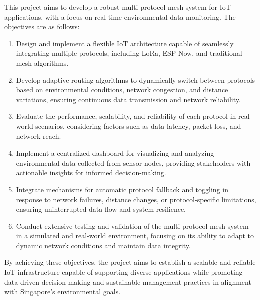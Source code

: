 This project aims to develop a robust multi-protocol mesh system for IoT applications, with a focus on real-time environmental data monitoring. The objectives are as follows:

\begin{enumerate}
    \item Design and implement a flexible IoT architecture capable of seamlessly integrating multiple protocols, including LoRa, ESP-Now, and traditional mesh algorithms.
    \item Develop adaptive routing algorithms to dynamically switch between protocols based on environmental conditions, network congestion, and distance variations, ensuring continuous data transmission and network reliability.
    \item Evaluate the performance, scalability, and reliability of each protocol in real-world scenarios, considering factors such as data latency, packet loss, and network reach.
    \item Implement a centralized dashboard for visualizing and analyzing environmental data collected from sensor nodes, providing stakeholders with actionable insights for informed decision-making.
    \item Integrate mechanisms for automatic protocol fallback and toggling in response to network failures, distance changes, or protocol-specific limitations, ensuring uninterrupted data flow and system resilience.
    \item Conduct extensive testing and validation of the multi-protocol mesh system in a simulated and real-world environment, focusing on its ability to adapt to dynamic network conditions and maintain data integrity.
\end{enumerate}

By achieving these objectives, the project aims to establish a scalable and reliable IoT infrastructure capable of supporting diverse applications while promoting data-driven decision-making and sustainable management practices in alignment with Singapore's environmental goals.


